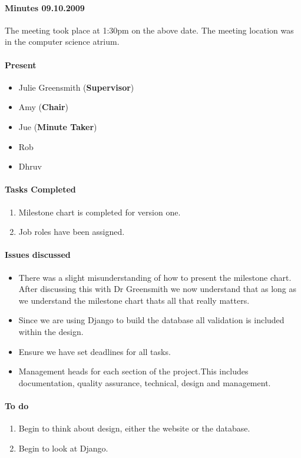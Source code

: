 \paragraph{Minutes 09.10.2009}  
The meeting took place at 1:30pm on the above date. The meeting location was in the computer science atrium. 

\paragraph{Present}

\begin{itemize}
	\item Julie Greensmith (\textbf{Supervisor})
	\item Amy (\textbf{Chair})
	\item Jue (\textbf{Minute Taker})
	\item Rob 
	\item Dhruv 	
	
\end{itemize}

\paragraph{Tasks Completed}

\begin{enumerate}
	\item Milestone chart is completed for version one.
	\item Job roles have been assigned. 
\end{enumerate}


\paragraph{Issues discussed}

\begin{itemize}
	\item There was a slight misunderstanding of how to present the milestone chart. After discussing this with Dr Greensmith we now understand that as long as we understand the milestone chart thats all that really matters. 
	\item Since we are using Django to build the database all validation is included within the design.
	\item Ensure we have set deadlines for all tasks. 
	\item Management heads for each section of the project.This includes documentation, quality assurance, technical, design and management.  
\end{itemize}

\paragraph{To do}

\begin{enumerate}
	\item Begin to think about design, either the website or the database.  
	\item Begin to look at Django.  
\end{enumerate}

